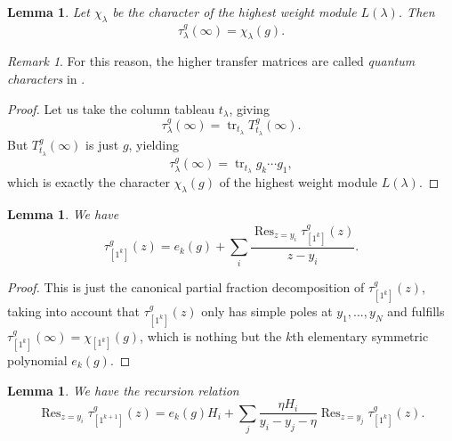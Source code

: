 \documentclass[11pt]{report}
\newtheorem{lemma}[theorem]{Lemma}
\theoremstyle{definition}
\theoremstyle{remark}
\newtheorem*{remark}{Remark}
\theoremstyle{remark}
\begin{document}
\begin{lemma}\label{lemma:transferMatrixExpansion}
Let $\chi_\lambda$ be the character of the highest weight module $L(\lambda)$. Then
\begin{equation*}
\tau_\lambda^g(\infty) = \chi_\lambda(g).
\end{equation*}
\end{lemma}

\begin{remark}
For this reason, the higher transfer matrices are called \emph{quantum characters} in \cite{book:arutyunov:betheAnsatz}.
\end{remark}

\begin{proof}
Let us take the column tableau $t_\lambda$, giving
\begin{equation*}
\tau_\lambda^g(\infty) = \operatorname{tr}_{t_\lambda} T_{t_\lambda}^g(\infty).
\end{equation*}
But $T_{t_\lambda}^g(\infty)$ is just $g$, yielding
\begin{equation*}
\tau_\lambda^g(\infty) = \operatorname{tr}_{t_\lambda} g_k \cdots g_1,
\end{equation*}
which is exactly the character $\chi_\lambda(g)$ of the highest weight module $L(\lambda)$.
\end{proof}

\begin{lemma}
We have
\begin{equation*}
\tau_{[1^k]}^g(z) = e_k(g) + \sum_i \frac{\operatorname{Res}_{z=y_i} \tau_{[1^k]}^g(z)}{z-y_i}.
\end{equation*}
\end{lemma}

\begin{proof}
This is just the canonical partial fraction decomposition of $\tau_{[1^k]}^g(z)$, taking into account that $\tau_{[1^k]}^g(z)$ only has simple poles at $y_1,...,y_N$ and fulfills $\tau_{[1^k]}^g(\infty) = \chi_{[1^k]}(g)$, which is nothing but the $k$th elementary symmetric polynomial $e_k(g)$.
\end{proof}

\begin{lemma}\label{lemma:recursionRelation}
We have the recursion relation
\begin{equation*}
\operatorname{Res}_{z=y_i} \tau_{[1^{k+1}]}^g(z)
= e_k(g) H_i + \sum_j \frac{\eta H_i}{y_i-y_j-\eta} \operatorname{Res}_{z=y_j} \tau_{[1^k]}^g(z).
\end{equation*}
\end{lemma}
\end{document}
